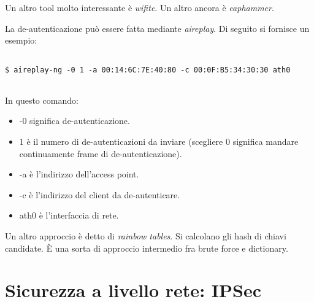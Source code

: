 \documentclass[14pt]{extreport}
\begin{document}
\vspace{5pt}


Un altro tool molto interessante è \textit{wifite}. Un altro ancora è \textit{eaphammer}.




La de-autenticazione può essere fatta mediante \textit{aireplay}. Di seguito si fornisce un esempio:

\vspace{5pt}

{
\small
\begin{tcolorbox}

\begin{verbatim}

$ aireplay-ng -0 1 -a 00:14:6C:7E:40:80 -c 00:0F:B5:34:30:30 ath0
  
\end{verbatim}

\end{tcolorbox}
}

\vspace{5pt}



In questo comando:


\begin{itemize}
    \item -0 significa de-autenticazione.
    
    \item 1 è il numero di de-autenticazioni da inviare (scegliere 0 significa mandare continuamente frame di de-autenticazione).
    
    
    \item -a è l'indirizzo dell'access point.
    
    \item -c è l'indirizzo del client da de-autenticare.
    
    \item ath0 è l'interfaccia di rete.
\end{itemize}



Un altro approccio è detto di \textit{rainbow tables}. Si calcolano gli hash di chiavi candidate. È una sorta di approccio intermedio fra brute force e dictionary. 





\chapter{Sicurezza a livello rete: IPSec}
\end{document}
